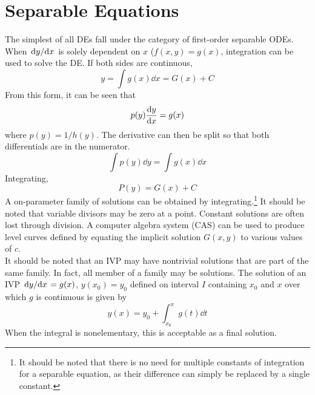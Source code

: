 \documentclass[./Differential Equations.tex]{subfiles}
\begin{document}
	\section{Separable Equations}
		The simplest of all DEs fall under the category of first-order separable ODEs.
			When \(\dv*{y}{x}\) is solely dependent on \(x\) (\(f(x, y) = g(x)\), integration can be used to solve the DE. If both sides are continuous,
				\[y = \int{g(x)}\dd{x} = G(x) + C\]
			From this form, it can be seen that
				\[p(y)\dv{y}{x} = g(x)\]
				where \(p(y) = 1/h(y)\). The derivative can then be split so that both differentials are in the numerator.
				\[\int p(y)\dd{y} = \int g(x)\dd{x}\]
				Integrating,
					\[P(y) = G(x) + C\] 
			A on-parameter family of solutions can be obtained by integrating.\footnote{It should be noted that there is no need for multiple constants of integration for a separable equation, as their difference can simply be replaced by a single constant.}
			It should be noted that variable divisors may be zero at a point. Constant solutions are often lost through division.
			A computer algebra system (CAS) can be used to produce level curves defined by equating the implicit solution \(G(x, y)\) to various values of \(c\). \\
			It should be noted that an IVP may have nontrivial solutions that are part of the same family. In fact, all member of a family may be solutions.
			The solution of an IVP \(\dv*{y}{x} = g(x)\), \(y(x_0) = y_0\) defined on interval \(I\) containing \(x_0\) and \(x\) over which \(g\) is continuous is given by
				\[y(x) = y_0 + \int_{x_0}^x g(t)\dd{t}\]
				When the integral is nonelementary, this is acceptable as a final solution.
\end{document}
